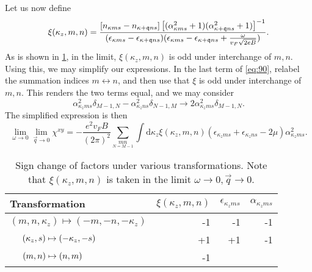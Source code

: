 Let us now define
\begin{equation}
  \xi(\kappa_z, m, n) = \frac{[n_{\kappa ms} - n_{\kappa + \mathfrak{q} ns}]
  \left[ (\alpha_{\kappa ms}^2 + 1) (\alpha_{\kappa +\mathfrak{q} ns}^2 + 1) \right]^{-1}
  }{
    (\epsilon _{\kappa m s} - \epsilon _{\kappa +\mathfrak{q}ns} )
    (\epsilon _{\kappa m s} - \epsilon _{\kappa +\mathfrak{q}ns} + \frac{ \omega }{v_F \sqrt{2 e B  }} )
  }.
\end{equation}
As is shown in \cref{tab:transform-sign}, in the limit, \( \xi(\kappa_z, m, n) \) is odd under interchange of \( m,n \).
Using this, we may simplify our expressions.
In the last term of \cref{eq:90}, relabel the summation indices \( m \leftrightarrow n \), and then use that \( \xi \) is odd under interchange of \( m,n \).
This renders the two terms equal, and we may consider
\[
\alpha_{\kappa_z m s}^2 \delta_{M-1,N} - \alpha_{\kappa_z n s}^2 \delta_{N-1, M} \to 2 \alpha_{\kappa_z m s}^2 \delta_{M-1, N}.
\]
The simplified expression is then
\begin{equation}
  \label{eq:91}
  \lim_{\omega \to 0} \lim_{\vec{q} \to 0} \chi^{xy} =
  -\frac{e^2 v_F B}{(2 \pi)^2} \sum\limits_{\underset{N=M-1}{mn}}
  \int \mathrm{d}\kappa_z \xi(\kappa_z, m, n)
  (\epsilon_{\kappa_z m s} + \epsilon_{\kappa_z n s} - 2 \mu) \alpha_{\kappa_z m s}^2.
\end{equation}

\begin{table}[ht]
  \centering
  \caption{Sign change of factors under various transformations. Note that \( \xi(\kappa_z, m, n) \) is taken in the limit \( \omega\to0, \vec{q}\to 0 \). \label{tab:transform-sign}}
  \begin{tabular}{l r r r}
    \toprule
    Transformation & \( \xi(\kappa_z, m, n) \) & \( \epsilon_{\kappa_z m s} \) & \( \alpha_{\kappa_z m s} \)\\
    \midrule
    \( (m, n, \kappa_z) \mapsto (-m, -n, -\kappa_z) \) & -1 & -1 & -1\\
    \( \hphantom{(m, n, \kappa_z)}\mathllap{(\kappa_z, s)} \mapsto (-\kappa_z, -s) \) & +1 & +1 & -1\\
    \(  \hphantom{(m, n, \kappa_z)}\mathllap{ (m, n)} \mapsto (n, m)\) & -1 &&\\
    \bottomrule
  \end{tabular}
\end{table}

